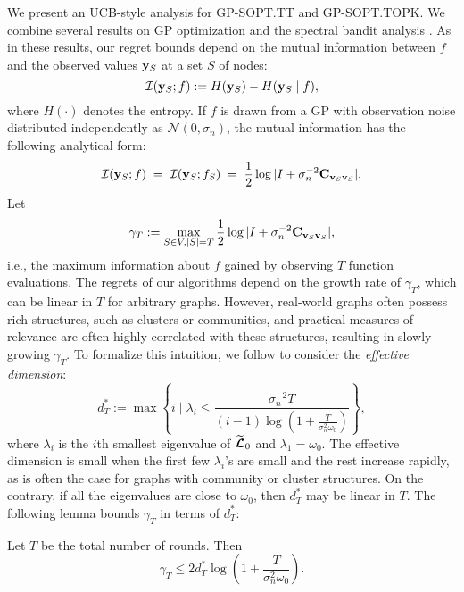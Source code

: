 
\newcommand{\hgamma}{\hat{\gamma}}
We present an UCB-style analysis for GP-SOPT.TT and GP-SOPT.TOPK. 
We combine
several results on GP optimization \citep{srinivas2012information,vanchinathanadaptively} 
and the spectral bandit analysis \citep{valko2014spectral}. 
As in these results, our regret bounds depend on the mutual information between $f$ and the 
observed values $\mathbf y_S$ at a set $S$ of nodes: 
\begin{equation}
	\mathcal{I}(\mathbf y_S ; f) := H(\mathbf y_S) - H(\mathbf y_S \mid f), 
\end{equation}
where $H(\cdot)$ denotes the entropy. If $f$ is drawn from a GP with observation noise distributed independently as $\mathcal{N}(0,\sigma_n)$,
the mutual information has the following analytical form:
\begin{equation}
	\mathcal{I}(\mathbf y_S; f) \;=\; \mathcal{I}(\mathbf y_S; f_S) \;=\; \frac{1}{2} \log |I + \sigma_n^{-2} {\mathbf C}_{\mathbf{v}_S\mathbf{v}_S}|.
\end{equation}
Let 
\begin{equation}
	\gamma_T := \max_{S \in V, |S| = T} \frac{1}{2} \log |I + \sigma_n^{-2} {\mathbf C}_{\mathbf{v}_S\mathbf{v}_S}|,
\end{equation}
i.e., the maximum information about $f$ gained by observing $T$ function evaluations. 
The regrets of our algorithms depend on the growth rate of $\gamma_T$, which can be linear in $T$ for arbitrary graphs. 
However, real-world graphs often possess rich structures, such as clusters or communities, and 
practical measures of relevance are often highly correlated with these structures, resulting in 
slowly-growing $\gamma_T$. To formalize this intuition, we follow 
\cite{valko2014spectral} to consider the \textit{effective dimension}:  
\begin{equation}
	d^*_T := \max \left\{i \mid \lambda_i \leq \frac{\sigma_n^{-2}T}{(i-1)\log(1 + \frac{T}{\sigma_n^2 \omega_0})} \right\},	
\end{equation}
where $\lambda_i$ is the $i$th smallest eigenvalue of $\widetilde{{\boldsymbol{\mathcal L}}}_0$ and $\lambda_1 = \omega_0$.
The effective dimension is small when the first few $\lambda_i$'s are small and the rest increase rapidly, 
as is often the case for graphs with community or cluster structures. On the contrary, if all the eigenvalues are close to $\omega_0$, then 
$d^*_T$ may be linear in $T$. The following lemma bounds $\gamma_T$ in terms of $d^*_T$:
\begin{lemma}
	\label{lemma:gamma_T}
Let $T$ be the total number of rounds. Then 
\begin{equation*}
	\gamma_T \leq 2 d^*_T \log \left( 1 + \frac{T}{ \sigma_n^2 \omega_0}\right).
\end{equation*}
\end{lemma}
